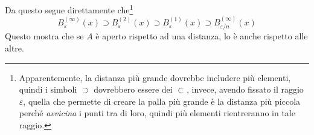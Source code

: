 \documentclass[12pt]{scrartcl}
\theoremstyle{style}
\numberwithin{equation}{subsection}
\begin{document}
Da questo segue direttamente che\footnote{Apparentemente, la distanza pi\`u grande dovrebbe includere pi\`u elementi, quindi i simboli $\supset$ dovrebbero essere dei $\subset$, invece, avendo fissato il raggio $\varepsilon $, quella che permette di creare la palla pi\`u grande \`e la distanza pi\`u piccola perch\'e \textit{avvicina} i punti tra di loro, quindi pi\`u elementi rientreranno in tale raggio.}
\begin{equation}
	B^{(\infty)} _\varepsilon (x) \supset B^{(2)} _\varepsilon (x) \supset B^{(1)} _{\varepsilon } (x) \supset B^{(\infty)} _{\varepsilon  / n} (x)
\end{equation}
Questo mostra che se $A$ \`e aperto rispetto ad una distanza, lo \`e anche rispetto alle altre.
\end{document}
